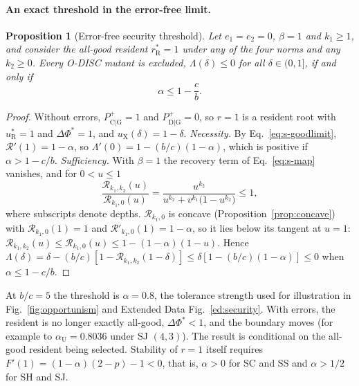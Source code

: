 \documentclass[fleqn,10pt]{wlscirep}
\newcommand{\Rmap}{\mathscr{R}}            %
\newcommand{\Pp}[1]{P^{+}_{\mathrm{#1}}}   %
\newcommand{\rR}{r_{\mathrm{R}}^{*}}
\newcommand{\uR}{u_{\mathrm{R}}^{*}}
\newcommand{\uX}{u_{\mathrm{X}}}
\newcommand{\dPhi}{\Delta\Phi^{*}}
\theoremstyle{plain}
\newtheorem{proposition}[lemma]{Proposition}
\begin{document}
\paragraph{An exact threshold in the error-free limit.}
\begin{proposition}[Error-free security threshold]\label{prop:errorfree}
Let $e_1=e_2=0$, $\beta=1$ and $k_1\geq1$, and consider the all-good resident $\rR=1$ under any of the four norms and any $k_2\geq0$. Every O-DISC mutant is excluded, $\Lambda(\delta)\leq0$ for all $\delta\in(0,1]$, if and only if
\begin{equation}
\alpha\leq1-\frac{c}{b}.
\label{eq:s-errorfree}
\end{equation}
\end{proposition}
\begin{proof}
Without errors, $\Pp{C|G}=1$ and $\Pp{D|G}=0$, so $r=1$ is a resident root with $\uR=1$ and $\dPhi=1$, and $\uX(\delta)=1-\delta$. \textit{Necessity.} By Eq.~\eqref{eq:s-goodlimit}, $\Rmap'(1)=1-\alpha$, so $\Lambda'(0)=1-(b/c)(1-\alpha)$, which is positive if $\alpha>1-c/b$. \textit{Sufficiency.} With $\beta=1$ the recovery term of Eq.~\eqref{eq:s-map} vanishes, and for $0<u\leq1$
\begin{equation*}
\frac{\Rmap_{k_1,k_2}(u)}{\Rmap_{k_1,0}(u)}=\frac{u^{k_2}}{u^{k_2}+v^{k_1}\bigl(1-u^{k_2}\bigr)}\leq1,
\end{equation*}
where subscripts denote depths. $\Rmap_{k_1,0}$ is concave (Proposition~\ref{prop:concave}) with $\Rmap_{k_1,0}(1)=1$ and $\Rmap'_{k_1,0}(1)=1-\alpha$, so it lies below its tangent at $u=1$: $\Rmap_{k_1,k_2}(u)\leq\Rmap_{k_1,0}(u)\leq1-(1-\alpha)(1-u)$. Hence $\Lambda(\delta)=\delta-(b/c)[1-\Rmap_{k_1,k_2}(1-\delta)]\leq\delta[1-(b/c)(1-\alpha)]\leq0$ when $\alpha\leq1-c/b$.
\end{proof}

At $b/c=5$ the threshold is $\alpha=0.8$, the tolerance strength used for illustration in Fig.~\ref{fig:opportunism} and Extended Data Fig.~\ref{ed:security}. With errors, the resident is no longer exactly all-good, $\dPhi<1$, and the boundary moves (for example to $\alpha_{\mathrm U}=0.8036$ under SJ $(4,3)$). The result is conditional on the all-good resident being selected. Stability of $r=1$ itself requires $F'(1)=(1-\alpha)(2-p)-1<0$, that is, $\alpha>0$ for SC and SS and $\alpha>1/2$ for SH and SJ.
\end{document}
